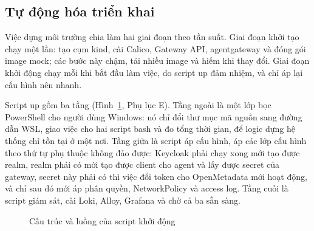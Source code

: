 \subsection{Tự động hóa triển khai}\label{sec:auto}

Việc dựng môi trường chia làm hai giai đoạn theo tần suất. Giai đoạn khởi tạo chạy một lần: tạo cụm kind, cài Calico, Gateway API, agentgateway và đóng gói image mock; các bước này chậm, tải nhiều image và hiếm khi thay đổi. Giai đoạn khởi động chạy mỗi khi bắt đầu làm việc, do script up đảm nhiệm, và chỉ áp lại cấu hình nên nhanh.

Script up gồm ba tầng (Hình~\ref{fig:up}, Phụ lục E). Tầng ngoài là một lớp bọc PowerShell cho người dùng Windows: nó chỉ đổi thư mục mã nguồn sang đường dẫn WSL, giao việc cho hai script bash và đo tổng thời gian, để logic dựng hệ thống chỉ tồn tại ở một nơi. Tầng giữa là script áp cấu hình, áp các lớp cấu hình theo thứ tự phụ thuộc không đảo được: Keycloak phải chạy xong mới tạo được realm, realm phải có mới tạo được client cho agent và lấy được secret của gateway, secret này phải có thì việc đổi token cho OpenMetadata mới hoạt động, và chỉ sau đó mới áp phân quyền, NetworkPolicy và access log. Tầng cuối là script giám sát, cài Loki, Alloy, Grafana và chờ cả ba sẵn sàng.

\begin{figure}[htbp]\centering
{}
\caption{Cấu trúc và luồng của script khởi động}\label{fig:up}\end{figure}

